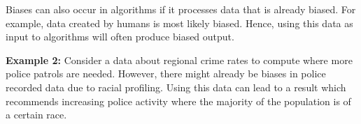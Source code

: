 \documentclass[a4paper]{article}
\begin{document}
Biases can also occur in algorithms if it processes data that is already biased.
For example, data created by humans is most likely biased.
Hence, using this data as input to algorithms will often produce biased output.

\textbf{Example 2:}
Consider a data about regional crime rates to compute where more police patrols are needed.
However, there might already be biases in police recorded data due to racial profiling.
Using this data can lead to a result which recommends increasing police activity where the majority of the population is of a certain race.
\end{document}
